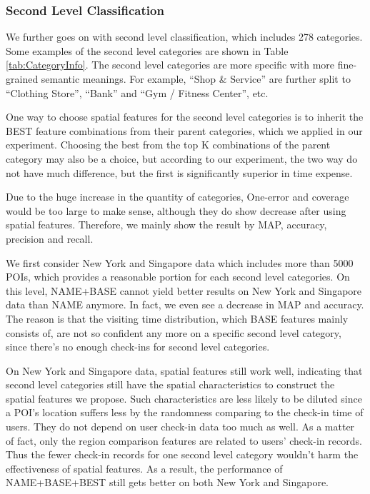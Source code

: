 \subsubsection{ Second Level Classification}
\label{exp4}
We further goes on with second level classification,
which includes 278 categories. Some examples of the second level
categories are shown in Table \ref{tab:CategoryInfo}.
The second level categories are more specific with more fine-grained semantic meanings.
For example, ``Shop \& Service'' are further split to
``Clothing Store'', ``Bank'' and ``Gym / Fitness Center'', etc.

One way to choose spatial features for the second level categories
is to inherit the BEST feature combinations from their parent categories,
which we applied in our experiment. Choosing the best from the top K combinations
of the parent category may also be a choice, but according to our experiment,
the two way do not have much difference, but the first is significantly superior in time expense.

Due to the huge increase in the quantity of categories,
One-error and coverage would be too large to make sense,
although they do show decrease after using spatial features.
Therefore, we mainly show the result by MAP, accuracy, precision and recall.

We first consider New York and Singapore data which includes
more than 5000 POIs, which provides a reasonable portion for
each second level categories. On this level, NAME+BASE cannot yield better results
on New York and Singapore data than NAME anymore. In fact, we even see a decrease
in MAP and accuracy. The reason is that the visiting time distribution,
which BASE features mainly consists of, are not so confident any more
on a specific second level category, since there's no enough check-ins
for second level categories.

On New York and Singapore data, spatial features still work well,
indicating that second level categories still have the spatial characteristics
to construct the spatial features we propose. Such characteristics are less
likely to be diluted since a POI's location suffers less by the randomness
comparing to the check-in time of users. They do not depend on user check-in
data too much as well. As a matter of fact, only the region comparison features
are related to users' check-in records. Thus the fewer check-in records for
one second level category wouldn't harm the effectiveness of spatial features.
As a result, the performance of NAME+BASE+BEST still gets better on both
New York and Singapore.

